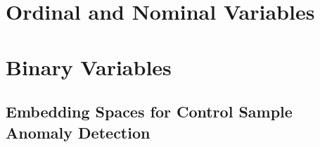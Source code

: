\documentclass[12pt,a4paper,oneside]{report}
\begin{document}
\section{Ordinal and Nominal Variables}




\section{Binary Variables}
\subsection{Embedding Spaces for Control Sample Anomaly Detection}
\end{document}
